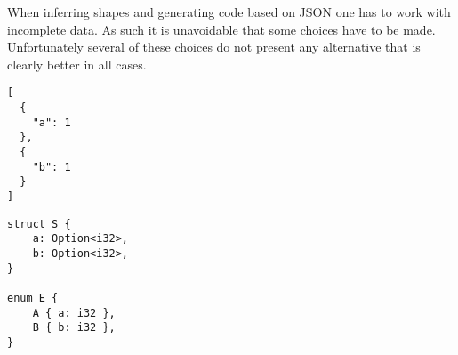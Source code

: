 When inferring shapes and generating code based on JSON one has to work with incomplete data. As such it is unavoidable that some choices have to be made. Unfortunately several of these choices do not present any alternative that is clearly better in all cases.

\begin{listing}[ht!]
\begin{verbatim}
[
  {
    "a": 1
  },
  {
    "b": 1
  }
]
\end{verbatim}
\caption{JSON Dilemma \#1}
\label{lst:json-dilemma-1}
\end{listing}

\begin{listing}[ht!]
\begin{verbatim}
struct S {
    a: Option<i32>,
    b: Option<i32>,
}

enum E {
    A { a: i32 },
    B { b: i32 },
}
\end{verbatim}
\caption{JSON Dilemma \#1 - Two solutions}
\label{lst:json-dilemma-1-rs}
\end{listing}
